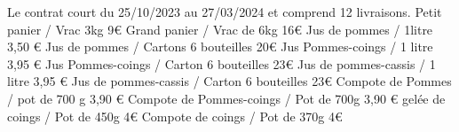 \documentclass[8pt,a4paper,french]{article}
\begin{document}
\noindent Le contrat court du 25/10/2023 au 27/03/2024 et comprend 12 livraisons.\newline\newline
{\color{Blue} Petit panier / Vrac 3kg 9€}\newline
{\color{Blue} Grand panier / Vrac de 6kg 16€}\newline
{\color{Blue} Jus de pommes / 1litre 3,50 €}\newline
{\color{Blue} Jus de pommes / Cartons 6 bouteilles 20€}\newline
{\color{Blue} Jus Pommes-coings / 1 litre 3,95 €}\newline
{\color{Blue} Jus Pommes-coings / Carton 6 bouteilles 23€}\newline
{\color{Blue} Jus de pommes-cassis / 1 litre 3,95 € }\newline
{\color{Blue} Jus de pommes-cassis / Carton 6 bouteilles 23€ }\newline
{\color{Blue} Compote de Pommes / pot de 700 g 3,90 € }\newline
{\color{Blue} Compote de Pommes-coings / Pot de 700g 3,90 € }\newline
{\color{Blue} gelée de coings / Pot de 450g 4€}\newline
{\color{Blue} Compote de coings  / Pot de 370g 4€}
\end{document}
